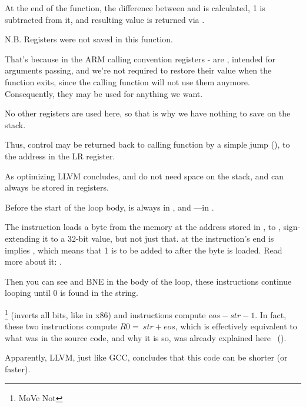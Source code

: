 At the end of the function, the difference between 
 and  is calculated, 1 is subtracted from it, and resulting value is returned
via .

N.B. Registers were not saved in this function.

That's because in the ARM calling convention registers - are , 
intended for arguments passing,
and we're not required to restore their value when the function exits, 
since the calling function will not use them anymore.
Consequently, they may be used for anything we want.

No other registers are used here, so that is why we have nothing to save on the stack.

Thus, control may be returned back to calling function by a simple jump (),
to the address in the \ac{LR} register.

\myparagraphold{\OptimizingXcodeIV (\ThumbMode)}



As optimizing LLVM concludes,  and  do not need space on the stack, and can always be stored in registers.

Before the start of the loop body,  is always in , 
and ---in .

The  instruction loads a byte from the memory at the address stored in , to , sign-extending it to a 32-bit value, but not just that.
 at the instruction's end is implies , which means that 1 is to be added to  after the byte is loaded.
Read more about it: .

Then you can see \CMP and \ac{BNE} in the body of the loop, these instructions continue looping until 0 is found in the string.

\footnote{MoVe Not} (inverts all bits, like \NOT in x86) and \ADD instructions compute $eos - str - 1$.
In fact, these two instructions compute $R0 = ~str + eos$, 
which is effectively equivalent to what was in the source code, and why it is so, was already explained here
~().

Apparently, LLVM, just like GCC, concludes that this code can be shorter (or faster).

